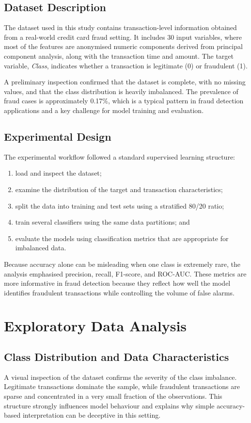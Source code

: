 \section{Dataset Description}
The dataset used in this study contains transaction-level information obtained from a real-world credit card fraud setting. It includes 30 input variables, where most of the features are anonymised numeric components derived from principal component analysis, along with the transaction time and amount. The target variable, \textit{Class}, indicates whether a transaction is legitimate (0) or fraudulent (1).

A preliminary inspection confirmed that the dataset is complete, with no missing values, and that the class distribution is heavily imbalanced. The prevalence of fraud cases is approximately 0.17\%, which is a typical pattern in fraud detection applications and a key challenge for model training and evaluation.

\section{Experimental Design}
The experimental workflow followed a standard supervised learning structure:
\begin{enumerate}
  \item load and inspect the dataset;
  \item examine the distribution of the target and transaction characteristics;
  \item split the data into training and test sets using a stratified 80/20 ratio;
  \item train several classifiers using the same data partitions; and
  \item evaluate the models using classification metrics that are appropriate for imbalanced data.
\end{enumerate}

Because accuracy alone can be misleading when one class is extremely rare, the analysis emphasised precision, recall, F1-score, and ROC-AUC. These metrics are more informative in fraud detection because they reflect how well the model identifies fraudulent transactions while controlling the volume of false alarms.

\chapter{Exploratory Data Analysis}
\section{Class Distribution and Data Characteristics}
A visual inspection of the dataset confirms the severity of the class imbalance. Legitimate transactions dominate the sample, while fraudulent transactions are sparse and concentrated in a very small fraction of the observations. This structure strongly influences model behaviour and explains why simple accuracy-based interpretation can be deceptive in this setting.

